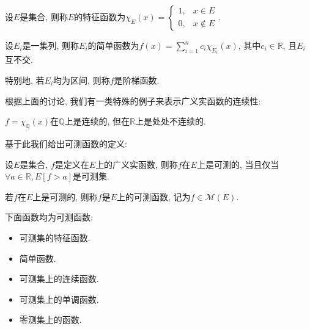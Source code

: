 \documentclass[theorem=false,mathfont=none,openany,sub3section]{easybook}
\begin{document}
\begin{definition}
  设$E$是集合, 则称$E$的特征函数为$\chi_E(x)=\begin{cases}
    1, & x\in E \\
    0, & x\notin E
  \end{cases}$.\par
  设$E_i$是一集列, 则称$E_i$的简单函数为$f(x)=\sum_{i=1}^{n}c_i\chi_{E_i}(x)$, 其中$c_i\in \mathbb{R}$, 且$E_i$互不交.\par
  特别地, 若$E_i$均为区间, 则称$f$是阶梯函数.\par
\end{definition}

根据上面的讨论, 我们有一类特殊的例子来表示广义实函数的连续性:\par

\begin{example}
  $f=\chi_{\mathbb{Q}}(x)$在$\mathbb{Q}$上是连续的, 但在$\mathbb{R}$上是处处不连续的.\par
\end{example}

基于此我们给出可测函数的定义:\par

\begin{definition}
  设$E$是集合, $f$是定义在$E$上的广义实函数, 则称$f$在$E$上是可测的, 当且仅当$\forall a\in \mathbb{R}, E[f> a]$是可测集.\par
  若$f$在$E$上是可测的, 则称$f$是$E$上的可测函数, 记为$f\in \mathcal{M}(E)$.\par
\end{definition}

\begin{theorem}
  下面函数均为可测函数:\par
  \begin{itemize}
    \item 可测集的特征函数.\par
    \item 简单函数.\par
    \item 可测集上的连续函数.\par
    \item 可测集上的单调函数.\par
    \item 零测集上的函数.\par
  \end{itemize}
\end{theorem}
\end{document}
